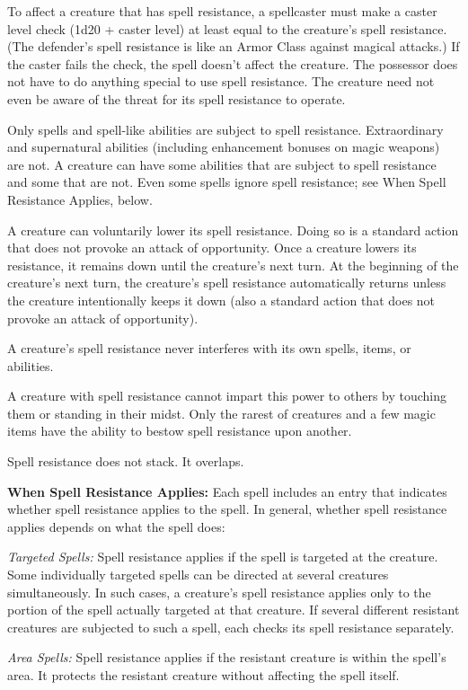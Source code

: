 To affect a creature that has spell resistance, a spellcaster must make a caster level check (1d20 + caster level) at least equal to the creature's spell resistance. (The defender's spell resistance is like an Armor Class against magical attacks.) If the caster fails the check, the spell doesn't affect the creature. The possessor does not have to do anything special to use spell resistance. The creature need not even be aware of the threat for its spell resistance to operate.

Only spells and spell-like abilities are subject to spell resistance. Extraordinary and supernatural abilities (including enhancement bonuses on magic weapons) are not. A creature can have some abilities that are subject to spell resistance and some that are not. Even some spells ignore spell resistance; see When Spell Resistance Applies, below.

A creature can voluntarily lower its spell resistance. Doing so is a standard action that does not provoke an attack of opportunity. Once a creature lowers its resistance, it remains down until the creature's next turn. At the beginning of the creature's next turn, the creature's spell resistance automatically returns unless the creature intentionally keeps it down (also a standard action that does not provoke an attack of opportunity).

A creature's spell resistance never interferes with its own spells, items, or abilities.

A creature with spell resistance cannot impart this power to others by touching them or standing in their midst. Only the rarest of creatures and a few magic items have the ability to bestow spell resistance upon another.

Spell resistance does not stack. It overlaps.

\textbf{When Spell Resistance Applies:} Each spell includes an entry that indicates whether spell resistance applies to the spell. In general, whether spell resistance applies depends on what the spell does:

\textit{Targeted Spells:} Spell resistance applies if the spell is targeted at the creature. Some individually targeted spells can be directed at several creatures simultaneously. In such cases, a creature's spell resistance applies only to the portion of the spell actually targeted at that creature. If several different resistant creatures are subjected to such a spell, each checks its spell resistance separately.

\textit{Area Spells:} Spell resistance applies if the resistant creature is within the spell's area. It protects the resistant creature without affecting the spell itself.

